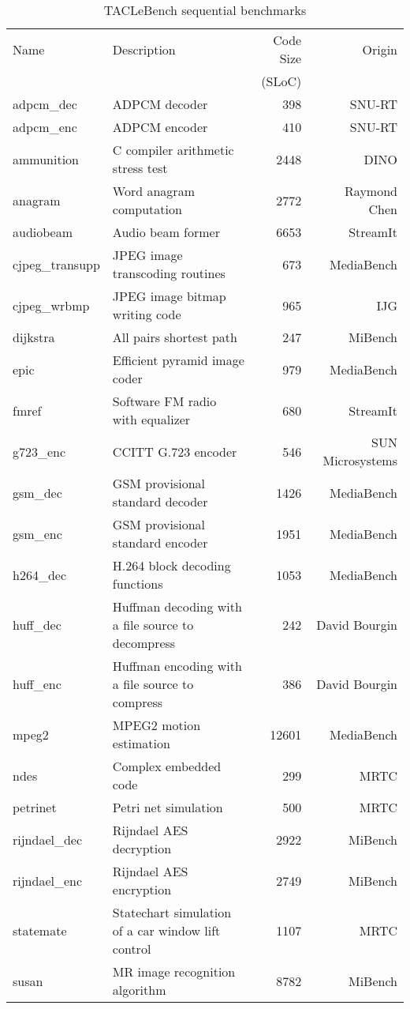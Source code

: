 \documentclass[a4paper,UKenglish]{oasics}
\begin{document}
\begin{table}
\centering
\caption{\label{tab:bench_sequential}TACLeBench sequential benchmarks}  
\begin{tabular}{lp{5cm}rr}
\toprule
Name & Description & Code Size & Origin\\
   & &  (SLoC) & \\ \midrule
adpcm\_dec & ADPCM decoder & 398 & SNU-RT \\
adpcm\_enc &  ADPCM encoder  & 410  & SNU-RT \\
ammunition & C compiler arithmetic stress test  & 2448 & DINO \\
anagram &  Word anagram computation & 2772  & Raymond Chen \\
audiobeam &  Audio beam former  & 6653  & StreamIt \\
cjpeg\_transupp &  JPEG image transcoding routines  & 673 & MediaBench \\
cjpeg\_wrbmp & JPEG image bitmap writing code & 965 & IJG \\
dijkstra & All pairs shortest path  & 247  & MiBench \\
epic & Efficient pyramid image coder  & 979  & MediaBench \\
fmref &  Software FM radio with equalizer & 680  & StreamIt \\
g723\_enc &  CCITT G.723 encoder  & 546  & SUN Microsystems \\
gsm\_dec & GSM provisional standard decoder & 1426 & MediaBench \\
gsm\_enc & GSM provisional standard encoder & 1951 & MediaBench \\
h264\_dec &  H.264 block decoding functions & 1053 & MediaBench \\
huff\_dec &  Huffman decoding with a file source to decompress  & 242  & David Bourgin \\
huff\_enc & Huffman encoding with a file source to compress  & 386  & David Bourgin \\
mpeg2 &  MPEG2 motion estimation  & 12601 & MediaBench \\
ndes & Complex embedded code  & 299  & MRTC \\
petrinet & Petri net simulation & 500  & MRTC \\
rijndael\_dec & Rijndael AES decryption  & 2922 & MiBench \\
rijndael\_enc & Rijndael AES encryption  & 2749 & MiBench \\
statemate &  Statechart simulation of a car window lift control & 1107 & MRTC \\
susan &  MR image recognition algorithm & 8782 & MiBench \\
\bottomrule
\end{tabular}
\end{table}
\end{document}
